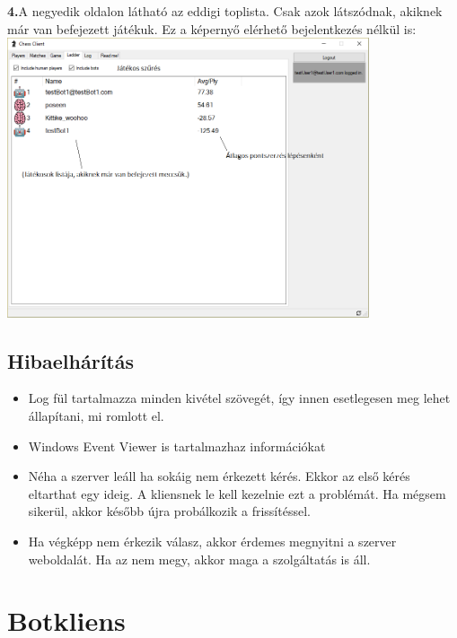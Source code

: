\documentclass[twoside, a4paper, 12pt]{article}
\begin{document}
\noindent \textbf{4.}A negyedik oldalon látható az eddigi toplista. Csak azok látszódnak, akiknek már van befejezett játékuk. Ez a képernyő elérhető bejelentkezés nélkül is: \\
\includegraphics[width=0.8\textwidth]{img/chessClient_4.png} \\
\subsection{Hibaelhárítás}
\begin{itemize}
	\item Log fül tartalmazza minden kivétel szövegét, így innen esetlegesen meg lehet állapítani, mi romlott el.
	\item Windows Event Viewer is tartalmazhaz információkat
	\item Néha a szerver leáll ha sokáig nem érkezett kérés. Ekkor az első kérés eltarthat egy ideig. A kliensnek le kell kezelnie ezt a problémát. Ha mégsem sikerül, akkor később újra probálkozik a frissítéssel.
	\item Ha végképp nem érkezik válasz, akkor érdemes megnyitni a szerver weboldalát. Ha az nem megy, akkor maga a szolgáltatás is áll.
\end{itemize}
	

\section{Botkliens}
\end{document}
